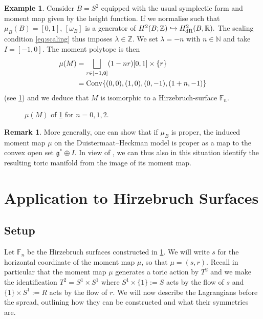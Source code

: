 \documentclass[10pt,oneside,reqno]{amsart}
\theoremstyle{definition}
\newtheorem*{remark}{Remark}
\newtheorem{example}[theorem]{Example}
\newcommand{\fg}{\mathfrak{g}}
\newcommand{\IR}{\mathbb{R}}
\newcommand{\IZ}{\mathbb{Z}}
\newcommand{\FF}{\mathbb{F}}
\newcommand{\dR}{\textup{dR}}
\begin{document}
\begin{example} \label{ex:Hirzebruchs}
    Consider $B=S^2$ equipped with the usual symplectic form and moment map given by the height function. If we normalise such that $\mu_B(B) = [0,1]$, $[\omega_B]$ is a generator of $H^2(B;\IZ)\hookrightarrow H^2_\dR(B,\IR).$ The scaling condition \eqref{eq:scaling} thus imposes $\lambda\in \IZ.$ We set $\lambda =-n$ with $n\in \mathbb{N}$ and take $I=[-1,0]$. The moment polytope is then
    \begin{align*}
        \mu(M) &= \bigsqcup_{r\in [-1,0]}(1-nr)[0,1] \times \{r\} \\
        &= \textup{Conv}\{(0,0), (1,0),(0,-1),(1+n,-1)\}
    \end{align*}
    (see \cref{fig:Hirzebruchs}) and we deduce that $M$ is isomorphic to a Hirzebruch-surface $\FF_n.$
    \begin{figure}[h]
        \centering
        \caption{$\mu(M)$ of \cref{ex:Hirzebruchs} for $n=0,1,2.$}
        \label{fig:Hirzebruchs}
    \end{figure}
\end{example}


\begin{remark}
    More generally, one can show that if $\mu_B$ is proper, the induced moment map $\mu$ on the Duistermaat--Heckman model is proper as a map to the convex open set $\fg^*\oplus I.$ In view of \cite[Proposition 6.5]{karshon2015non}, we can thus also in this situation identify the resulting toric manifold from the image of its moment map.
\end{remark}


\section{Application to Hirzebruch Surfaces}
\subsection{Setup}
Let $\FF_n$ be the Hirzebruch surfaces constructed in \cref{ex:Hirzebruchs}. We will write $s$ for the horizontal coordinate of the moment map $\mu$, so that $\mu=(s,r)$. Recall in particular that the moment map $\mu$ generates a toric action by $T^2$ and we make the identification $T^2 = S^1 \times S^1$ where $S^1 \times \{1\}:= S$ acts by the flow of $s$ and $\{1\} \times S^1:=R$ acts by the flow of $r$. We will now describe the Lagrangians before the spread, outlining how they can be constructed and what their symmetries are.
\end{document}
